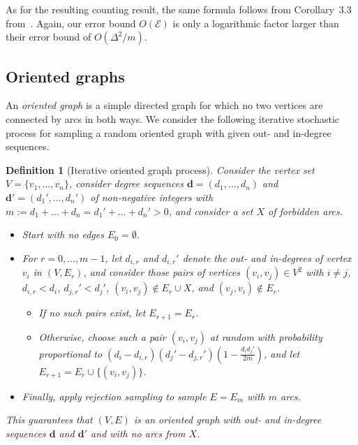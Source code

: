 \documentclass{article}
\theoremstyle{plain}
\theoremstyle{remark}
\theoremstyle{plain}
\newtheorem{definition}[theorem]{Definition}
\numberwithin{equation}{section}
\renewcommand{\d}{{\boldsymbol{d}}}
\begin{document}
	As for the resulting counting result, the same formula follows from Corollary~3.3 from~\cite{greenhill2026asymptoticenumerationconstrainedbipartite}. Again, our error bound $O(\mathscr{E})$ is only a logarithmic factor larger than their error bound of $O(\Delta^2/m)$.
	
	\subsection{Oriented graphs}\label{subsection_results_oriented}
	
	An \emph{oriented graph} is a simple directed graph for which no two vertices are connected by arcs in both ways. We consider the following iterative stochastic process for sampling a random oriented graph with given out- and in-degree sequences.
	
	\begin{definition}[Iterative oriented graph process]
		Consider the vertex set $V=\{v_1,\ldots,v_n\}$, consider degree sequences $\d=(d_1,\ldots,d_n)$ and $\d'=(d_1',\ldots,d_{n}')$ of non-negative integers with $m:=d_1+\ldots+d_n=d_1'+\ldots+d_{n}'>0$, and consider a set $X$ of forbidden arcs.
		\begin{itemize}
			\item Start with no edges $E_0=\emptyset$.
			\item For $r=0,\ldots,m-1$, let $d_{i,r}$ and $d_{i,r}'$ denote the out- and in-degrees of vertex $v_i$ in $(V,E_r)$, and consider those pairs of vertices $(v_i,v_j)\in V^2$ with $i\neq j$, $d_{i,r}<d_i$, $d_{j,r}'<d_j'$, $(v_i,v_j)\not\in E_r\cup X$, and $(v_j,v_i)\not\in E_r$.
			\begin{itemize}
				\item If no such pairs exist, let $E_{r+1}=E_r$.
				\item Otherwise, choose such a pair $(v_i,v_j)$ at random with probability proportional to $(d_i-d_{i,r})(d_j'-d_{j,r}')(1-\tfrac{d_id_j'}{2m})$, and let $E_{r+1}=E_r\cup\{(v_i,v_j)\}$.
			\end{itemize}
			\item Finally, apply rejection sampling to sample $E=E_m$ with $m$ arcs.
		\end{itemize}
		This guarantees that $(V,E)$ is an oriented graph with out- and in-degree sequences $\d$ and $\d'$ and with no arcs from $X$.
	\end{definition}
	
\end{document}
